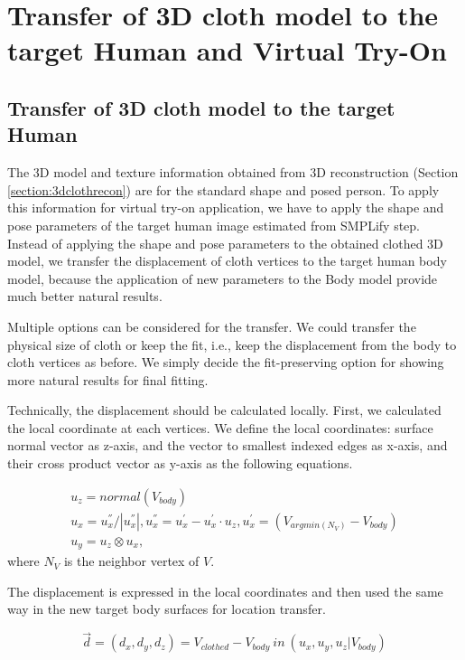 \section{Transfer of 3D cloth model to the target Human and Virtual Try-On }  \label{section:clothtransfer}


\subsection{Transfer of 3D cloth model to the target Human} 

The 3D model and texture information obtained from 3D reconstruction (Section \ref{section:3dclothrecon}) are for the standard shape and posed person. To apply this information for virtual try-on application, we have to apply the shape and pose parameters of the target human image estimated from SMPLify\cite{Bogo2016SMPLify} step.  Instead of applying the shape and pose parameters to the obtained clothed 3D model, we transfer the displacement of cloth vertices to the target human body model, because the application of new parameters to the Body model provide much better natural results.      


Multiple options can be considered for the transfer. We could transfer the physical size of cloth or keep the fit, i.e., keep the displacement from the body to cloth vertices as before.  We simply decide the fit-preserving option for showing more natural results for final fitting.  

Technically, the displacement should be calculated locally. First, we calculated the local coordinate at each vertices. We define the local coordinates: surface normal vector as z-axis, and the vector to smallest indexed edges as x-axis, and their cross product vector as y-axis as the following equations.


\begin{align}
 u_{z} =  normal(V_{body})  \\
 u_{x} = u^{''}_{x}/ |u^{''}_{x} |, 
 u^{''}_{x} = u^{'}_{x} - u^{'}_{x} \cdot u_{z}, 
 u^{'}_{x} = (V_{argmin(N_V) } - V_{body}) \\
 u_{y}  =  u_z \otimes u_x,
\end{align} 
 where $N_V$ is the neighbor vertex of $V$.
 

The displacement is expressed in the local coordinates and then used the same way in the new target body surfaces for location transfer.

\begin{equation}
\overrightarrow{d} = (d_x, d_y, d_z) = V_{clothed} - V_{body} \: in \: (u_x, u_y, u_z | V_{body})
\end{equation}


